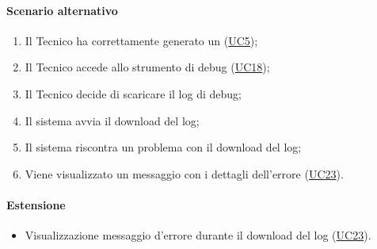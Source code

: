 \paragraph*{Scenario alternativo}
\begin{enumerate}
  \item Il Tecnico ha correttamente generato un  (\hyperref[UC5]{UC5});
  \item Il Tecnico accede allo strumento di debug (\hyperref[UC18]{UC18});
  \item Il Tecnico decide di scaricare il log di debug;
  \item Il sistema avvia il download del log;
  \item Il sistema riscontra un problema con il download del log;
  \item Viene visualizzato un messaggio con i dettagli dell'errore (\hyperref[UC23]{UC23}).
\end{enumerate}

\paragraph*{Estensione}
\begin{itemize}
    \item Visualizzazione messaggio d'errore durante il download del log (\hyperref[UC23]{UC23}).
\end{itemize}